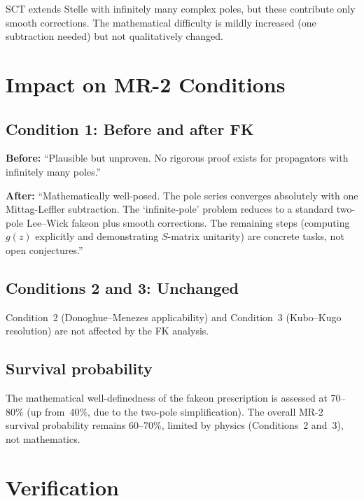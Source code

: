 \documentclass[11pt,a4paper]{article}
\begin{document}
\noindent
SCT extends Stelle with infinitely many complex poles, but these
contribute only smooth corrections.  The mathematical difficulty is
mildly increased (one subtraction needed) but not qualitatively changed.


\section{Impact on MR-2 Conditions}
\label{sec:impact}

\subsection{Condition 1: Before and after FK}

\textbf{Before:} ``Plausible but unproven.  No rigorous proof exists
for propagators with infinitely many poles.''

\textbf{After:} ``Mathematically well-posed.  The pole series
converges absolutely with one Mittag-Leffler subtraction.  The
`infinite-pole' problem reduces to a standard two-pole Lee--Wick
fakeon plus smooth corrections.  The remaining steps (computing~$g(z)$
explicitly and demonstrating $S$-matrix unitarity) are concrete tasks,
not open conjectures.''

\subsection{Conditions 2 and 3: Unchanged}

Condition~2 (Donoghue--Menezes applicability) and Condition~3
(Kubo--Kugo resolution) are not affected by the FK analysis.

\subsection{Survival probability}

The mathematical well-definedness of the fakeon prescription is
assessed at 70--80\% (up from~40\%, due to the two-pole
simplification).  The overall MR-2 survival probability remains
60--70\%, limited by physics (Conditions~2 and~3), not mathematics.


\section{Verification}
\label{sec:verification}
\end{document}
